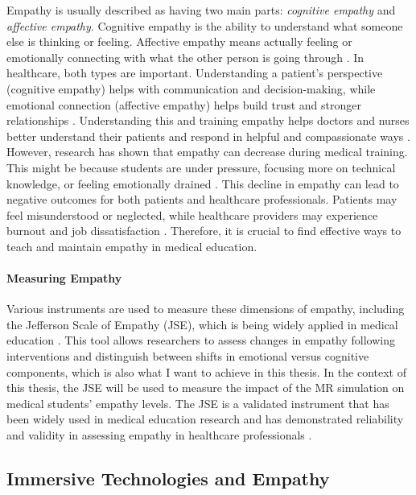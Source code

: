 Empathy is usually described as having two main parts: \textit{cognitive empathy} and \textit{affective empathy}. Cognitive empathy is the ability to understand what someone else is thinking or feeling. Affective empathy means actually feeling or emotionally connecting with what the other person is going through \cite{Ventura2020, Martingano2021}. In healthcare, both types are important. Understanding a patient's perspective (cognitive empathy) helps with communication and decision-making, while emotional connection (affective empathy) helps build trust and stronger relationships \cite{Cunico2012, Ozcan2018}.  Understanding this and training empathy helps doctors and nurses better understand their patients and respond in helpful and compassionate ways \cite{Ozcan2018, Olson1995}. However, research has shown that empathy can decrease during medical training. This might be because students are under pressure, focusing more on technical knowledge, or feeling emotionally drained \cite{Mattsson2024, Ozcan2018}. This decline in empathy can lead to negative outcomes for both patients and healthcare professionals. Patients may feel misunderstood or neglected, while healthcare providers may experience burnout and job dissatisfaction \cite{Mattsson2024, Cunico2012}. Therefore, it is crucial to find effective ways to teach and maintain empathy in medical education.

\paragraph{Measuring Empathy}
Various instruments are used to measure these dimensions of empathy, including the Jefferson Scale of Empathy (JSE), which is being widely applied in medical education \cite{Alieldin2024}. This tool allows researchers to assess changes in empathy following interventions and distinguish between shifts in emotional versus cognitive components, which is also what I want to achieve in this thesis. In the context of this thesis, the JSE will be used to measure the impact of the MR simulation on medical students' empathy levels. The JSE is a validated instrument that has been widely used in medical education research and has demonstrated reliability and validity in assessing empathy in healthcare professionals \cite{Hojat2002}. 

\subsection{Immersive Technologies and Empathy}

